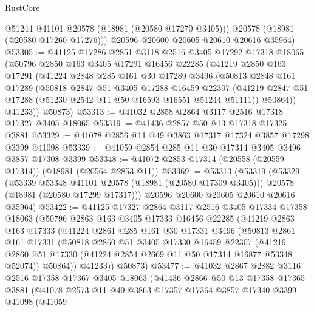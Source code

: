 \begin{lexlean}{RustCore}
\begin{coremodule}
          @51244
          @41101
          @20578
          (@18981 (@20580 @17270 @3405)))
        @20578
        (@18981 (@20580 @17260 @17276)))
      @20596
      @20600
      @20605
      @20610
      @20616
      @35964)
@53305 := @41125
    @17286
    @2851
    @3118
    @2516
    @3405
    @17292
    @17318
    @18065
    (@50796
      @2850
      @163
      @3405
      @17291
      @16456
      @22285
      (@41219
        @2850
        @163
        @17291
        (@41224
          @2848
          @285
          @161
          @30
          @17289
          @3496
          (@50813
            @2848
            @161
            @17289
            (@50818
              @2847
              @51
              @3405
              @17288
              @16459
              @22307
              (@41219 @2847 @51 @17288 (@51230 @2542 @11 @50 @16593 @16551 @51244 @51111))
              @50864))
          @41233))
      @50873)
@53313 := @41032 @2858 @2864 @3117 @2516 @17318 @17327 @3405 @18065
@53319 := @41436 @2857 @50 @13 @17318 @17325 @3881
@53329 := @41078 @2856 @11 @49 @3863 @17317 @17324 @3857 @17298 @3399 @41098
@53339 := @41059 @2854 @285 @11 @30 @17314 @3405 @3496 @3857 @17308 @3399
@53348 := @41072 @2853 @17314 (@20558 (@20559 @17314)) (@18981 (@20564 @2853 @11))
@53369 := @53313
    (@53319
      (@53329
        (@53339 @53348 @41101 @20578 (@18981 (@20580 @17309 @3405)))
        @20578
        (@18981 (@20580 @17299 @17317)))
      @20596
      @20600
      @20605
      @20610
      @20616
      @35964)
@53422 := @41125
    @17327
    @2864
    @3117
    @2516
    @3405
    @17334
    @17358
    @18063
    (@50796
      @2863
      @163
      @3405
      @17333
      @16456
      @22285
      (@41219
        @2863
        @163
        @17333
        (@41224
          @2861
          @285
          @161
          @30
          @17331
          @3496
          (@50813
            @2861
            @161
            @17331
            (@50818
              @2860
              @51
              @3405
              @17330
              @16459
              @22307
              (@41219 @2860 @51 @17330 (@41224 @2854 @2669 @11 @50 @17314 @16877 @53348 @52074))
              @50864))
          @41233))
      @50873)
@53477 := @41032
    @2867
    @2882
    @3116
    @2516
    @17358
    @17367
    @3405
    @18063
    (@41436
      @2866
      @50
      @13
      @17358
      @17365
      @3881
      (@41078
        @2573
        @11
        @49
        @3863
        @17357
        @17364
        @3857
        @17340
        @3399
        @41098
        (@41059

\end{coremodule}
\end{lexlean}
